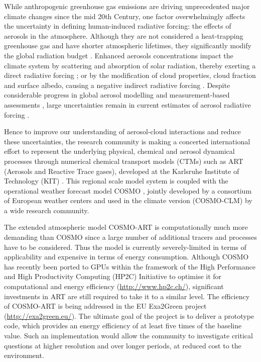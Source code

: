 While anthropogenic greenhouse gas emissions are driving unprecedented
major  climate  changes  since   the  mid  20th  Century,  one  factor
overwhelmingly  affects  the  uncertainty  in  defining  human-induced
radiative  forcing:  the  effects   of  aerosols  in  the  atmosphere.
Although they  are not considered  a heat-trapping greenhouse  gas and
have  shorter  atmospheric lifetimes,  they  significantly modify  the
global   radiation   budget   \citep{IPCC-2013}.   Enhanced   aerosols
concentrations impact the climate  system by scattering and absorption
of   solar   radiation,    thereby   exerting   a   direct   radiative
forcing  \citep{Liao-2005,  Bangert-2012,  Lundgren-2013}; or  by  the
modification of  cloud properties, cloud fraction  and surface albedo,
causing  a negative  indirect  radiative forcing  \citep{Haywood-2000,
Lohmann-2005,     VandenHeever-2011,     Rosenfeld-2013}.      Despite
considerable  progress in  global aerosol  modelling \citep{Mann-2013}
and    measurement-based    assessments   \citep{Myhre-2009},    large
uncertainties  remain  in   current  estimates  of  aerosol  radiative
forcing   \citep{Myhre-2013,    IPCC-2013,   Lee-2013,   Randles-2013,
Rosenfeld-2013, Sherwood-2013, Stier-2013}.

Hence to  improve our understanding of  aerosol-cloud interactions and
reduce  these  uncertainties,  the  research  community  is  making  a
concerted international  effort to represent  the underlying physical,
chemical  and aerosol dynamical  processes through  numerical chemical
transport  models (CTMs)  such  as ART  (Aerosols  and Reactive  Trace
gases),   developed   at  the   Karlsruhe   Institute  of   Technology
(KIT)  \citep{Vogel-2009,  Bangert-2011,  Knote-2013}.  This  regional
scale model  system is coupled  with the operational  weather forecast
model COSMO \citep{Baldauf-2011}, jointly developed by a consortium of
European weather  centers and used in the  climate version (COSMO-CLM)
by a wide research community.

The extended atmospheric model  COSMO-ART is computationally much more
demanding than  COSMO since a  large number of additional  tracers and
processes  have  to  be  considered.   Thus  the  model  is  currently
severely-limited in  terms of applicability and expensive  in terms of
energy  consumption.   Although  COSMO  has recently  been  ported  to
GPUs  \citep{Gysi-2014, Lapillonne-2014} within  the framework  of the
High Performance and High  Productivity Computing (HP2C) Initiative to
optimise    it    for     computational    and    energy    efficiency
(\url{http://www.hp2c.ch/}), significant investments  in ART are still
required to take  it to a similar level.   The efficiency of COSMO-ART
is     being    addressed    in     the    EU     Exa2Green    project
(\url{http://exa2green.eu/}). The  ultimate goal of the  project is to
deliver a  prototype code, which  provides an energy efficiency  of at
least five times of the  baseline value.  Such an implementation would
allow  the  community  to  investigate critical  questions  at  higher
resolution  and   over  longer  periods,   at  reduced  cost   to  the
environment.

